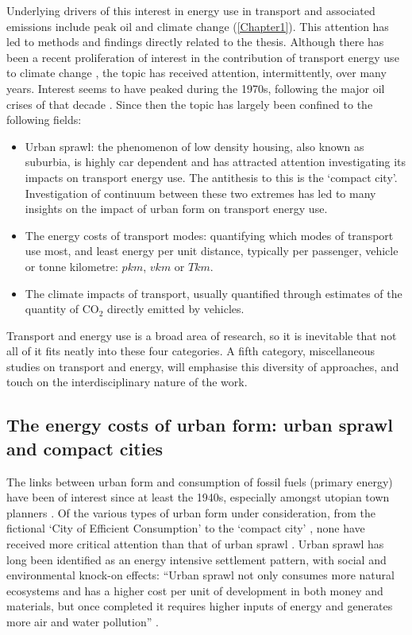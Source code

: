 \documentclass[a4paper, 11pt, twoside]{Thesis}
\begin{document}
Underlying drivers of this interest in energy use in transport and
associated emissions include peak oil and climate
change (\cref{Chapter1}). This attention has led to 
methods and findings directly related to the thesis.
Although there has been a recent proliferation of interest in the contribution of
transport energy use to climate change \citep{Schwanen2011}, the topic
has  received attention, intermittently, over many years. Interest seems to
have peaked during the 1970s,
following the major oil crises of that decade \citep{Greer2009}. Since then the
topic has largely been confined to the following fields:
\begin{itemize}
 \item Urban sprawl:
 the phenomenon of low density housing, also known as suburbia, is highly car
dependent and has attracted attention investigating its impacts on transport energy
use. The antithesis to this is the `compact city'. Investigation of continuum between
these two extremes has led to many insights on the impact of urban form on transport energy use.
\item The energy costs of transport modes: quantifying which modes of transport
use most, and least energy per unit distance, typically per passenger, vehicle or
tonne kilometre: $pkm$, $vkm$ or $Tkm$.
\item The climate impacts of transport, usually quantified through estimates
of the quantity of CO$_2$ directly emitted by vehicles.
\end{itemize}
Transport and energy use is a broad area of research, so it
is inevitable that not all of it fits neatly into these four categories. A fifth
category, miscellaneous studies on transport and energy, will emphasise this
diversity of approaches, and touch on the interdisciplinary nature of the work.

\subsection{The energy costs of urban form: urban sprawl and compact cities}
The links between urban form and consumption of fossil fuels (primary energy)
have been of interest since at least the 1940s, especially amongst utopian town
planners \citep{Steadman1977}. Of the various types of urban form under
consideration, from the fictional `City of Efficient Consumption'
\citep{Goodman1947} to the `compact city' \citep{Breheny1995}, none have
received more critical attention than that of urban sprawl \citep{Marshall2008}.
Urban sprawl has long been identified as an energy intensive settlement
pattern, with social and environmental knock-on effects: ``Urban sprawl not only
consumes more natural ecosystems and has a higher cost per unit of development
in both money and materials, but once completed it requires higher inputs of
energy and generates more air and water pollution'' \citep{Bormann1976}.
\end{document}
